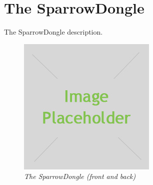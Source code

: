 \section{The SparrowDongle}

The SparrowDongle description.

\begin{figure}[ht]
	\begin{center}
		\includegraphics{img/placeholder.jpg}
	\end{center}
	\caption{\small \itshape{The SparrowDongle (front and back)}}
\end{figure}

